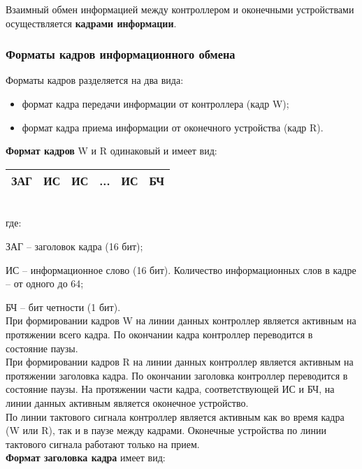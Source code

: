 		Взаимный обмен информацией между контроллером и оконечными устройствами осуществляется \textbf{кадрами информации}.
		
		\subsubsection{Форматы кадров информационного обмена}
		Форматы кадров разделяется на два вида:
		\begin{itemize}
			\item формат кадра передачи информации от контроллера (кадр W);
			\item формат кадра приема информации от оконечного устройства (кадр R). \\
		\end{itemize}
		
		\textbf{Формат кадров} W и R одинаковый и имеет вид: \\
		
		\begin{tabular}{ | c | c | c | c | c| c | }
			\hline
			ЗАГ & ИС & ИС & ... & ИС & БЧ \\
			\hline
		\end{tabular}
		\\
		
		где:
		
		\qquad ЗАГ – заголовок кадра (16 бит);
		
		\qquad ИС – информационное слово (16 бит). Количество информационных слов в кадре – от одного до 64;
		
		\qquad БЧ – бит четности (1 бит). \\
		
		При формировании кадров W на линии данных контроллер является активным на протяжении всего кадра. По окончании кадра контроллер переводится в состояние паузы.\\
		
		При формировании кадров R на линии данных контроллер является активным на протяжении заголовка кадра. По окончании заголовка контроллер переводится в состояние паузы. На протяжении части кадра, соответствующей ИС и БЧ, на линии данных активным является оконечное устройство. \\
		
		По линии тактового сигнала контроллер является активным как во время кадра (W или R), так и в паузе между кадрами. Оконечные устройства по линии тактового сигнала работают только на прием. \\
		
		\textbf{Формат заголовка кадра} имеет вид: \\
		
